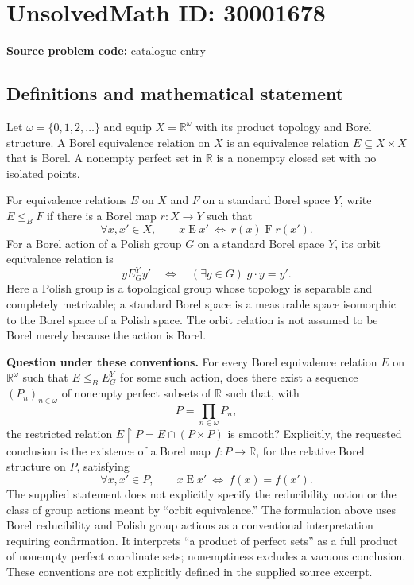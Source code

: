 \documentclass[11pt]{article}
\newcommand{\R}{\mathbb{R}}
\begin{document}
\section*{UnsolvedMath ID: 30001678}
\textbf{Source problem code:} catalogue entry
\subsection{Definitions and mathematical statement}
Let \(\omega=\{0,1,2,\ldots\}\) and equip \(X=\R^\omega\) with its product topology and Borel structure. A Borel equivalence relation on \(X\) is an equivalence relation \(E\subseteq X\times X\) that is Borel. A nonempty perfect set in \(\R\) is a nonempty closed set with no isolated points.

For equivalence relations \(E\) on \(X\) and \(F\) on a standard Borel space \(Y\), write \(E\leq_B F\) if there is a Borel map \(r:X\to Y\) such that
\[
\forall x,x'\in X,\qquad x\mathrel E x'\ \Longleftrightarrow\ r(x)\mathrel F r(x').
\]
For a Borel action of a Polish group \(G\) on a standard Borel space \(Y\), its orbit equivalence relation is
\[
y\mathrel{E_G^Y}y'\quad\Longleftrightarrow\quad (\exists g\in G)\;g\cdot y=y'.
\]
Here a Polish group is a topological group whose topology is separable and completely metrizable; a standard Borel space is a measurable space isomorphic to the Borel space of a Polish space. The orbit relation is not assumed to be Borel merely because the action is Borel.

\textbf{Question under these conventions.} For every Borel equivalence relation \(E\) on \(\R^\omega\) such that \(E\leq_B E_G^Y\) for some such action, does there exist a sequence \((P_n)_{n\in\omega}\) of nonempty perfect subsets of \(\R\) such that, with
\[
P=\prod_{n\in\omega}P_n,
\]
the restricted relation \(E\mathbin{\upharpoonright}P=E\cap(P\times P)\) is smooth? Explicitly, the requested conclusion is the existence of a Borel map \(f:P\to\R\), for the relative Borel structure on \(P\), satisfying
\[
\forall x,x'\in P,\qquad x\mathrel E x'\ \Longleftrightarrow\ f(x)=f(x').
\]
The supplied statement does not explicitly specify the reducibility notion or the class of group actions meant by ``orbit equivalence.'' The formulation above uses Borel reducibility and Polish group actions as a conventional interpretation requiring confirmation. It interprets ``a product of perfect sets'' as a full product of nonempty perfect coordinate sets; nonemptiness excludes a vacuous conclusion. These conventions are not explicitly defined in the supplied source excerpt.
\end{document}
